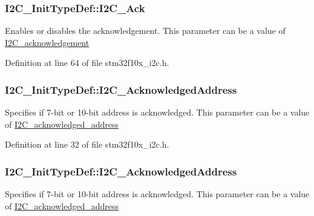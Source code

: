 \subsubsection[{\texorpdfstring{I2\+C\+\_\+\+Ack}{I2C_Ack}}]{ I2\+C\+\_\+\+Init\+Type\+Def\+::\+I2\+C\+\_\+\+Ack}\hypertarget{struct_i2_c___init_type_def_a7bcae26f098e897832e5e42b055f8c98}{}\label{struct_i2_c___init_type_def_a7bcae26f098e897832e5e42b055f8c98}
Enables or disables the acknowledgement. This parameter can be a value of \hyperlink{group___i2_c__acknowledgement}{I2\+C\+\_\+acknowledgement} 

Definition at line 64 of file stm32f10x\+\_\+i2c.\+h.

\subsubsection[{\texorpdfstring{I2\+C\+\_\+\+Acknowledged\+Address}{I2C_AcknowledgedAddress}}]{ I2\+C\+\_\+\+Init\+Type\+Def\+::\+I2\+C\+\_\+\+Acknowledged\+Address}\hypertarget{struct_i2_c___init_type_def_a4f88001fea5f77ac61db6dd5bb9cb09f}{}\label{struct_i2_c___init_type_def_a4f88001fea5f77ac61db6dd5bb9cb09f}
Specifies if 7-\/bit or 10-\/bit address is acknowledged. This parameter can be a value of \hyperlink{group___i2_c__acknowledged__address}{I2\+C\+\_\+acknowledged\+\_\+address} 

Definition at line 32 of file stm32f10x\+\_\+i2c.\+h.

\subsubsection[{\texorpdfstring{I2\+C\+\_\+\+Acknowledged\+Address}{I2C_AcknowledgedAddress}}]{ I2\+C\+\_\+\+Init\+Type\+Def\+::\+I2\+C\+\_\+\+Acknowledged\+Address}\hypertarget{struct_i2_c___init_type_def_a300e847972f50b0d25c4f13be5d93d79}{}\label{struct_i2_c___init_type_def_a300e847972f50b0d25c4f13be5d93d79}
Specifies if 7-\/bit or 10-\/bit address is acknowledged. This parameter can be a value of \hyperlink{group___i2_c__acknowledged__address}{I2\+C\+\_\+acknowledged\+\_\+address} 

